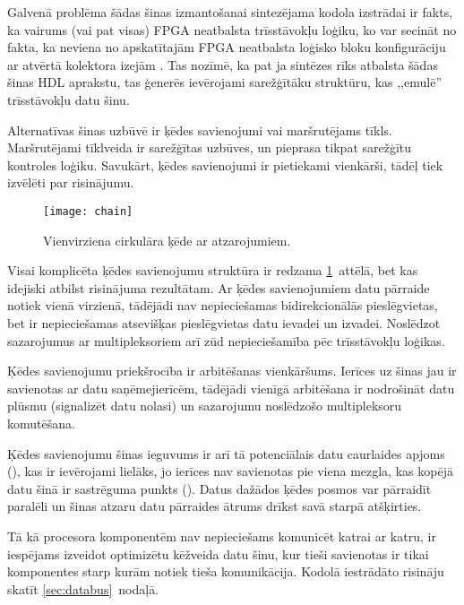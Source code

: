 	Galvenā problēma šādas šinas izmantošanai sintezējama kodola izstrādai ir
	fakts, ka vairums (vai pat visas) FPGA neatbalsta trīsstāvokļu
	loģiku, ko var secināt no fakta, ka neviena no apskatītajām FPGA neatbalsta
	loģisko bloku konfigurāciju ar atvērtā kolektora izejām
	\cite[18.~lpp.]{FusionFAQ}\cite{SmartFusionFabric}\cite{Xilinx7}.
	Tas nozīmē, ka pat ja sintēzes rīks atbalsta šādas šinas HDL aprakstu, tas
	ģenerēs ievērojami sarežģītāku struktūru, kas ,,emulē'' trīsstāvokļu datu šinu.

	Alternatīvas šinas uzbūvē ir ķēdes savienojumi vai maršrutējams tīkls.
	Maršrutējami tīklveida ir sarežģītas uzbūves, un pieprasa tikpat sarežģītu
	kontroles loģiku. Savukārt, ķēdes savienojumi ir pietiekami vienkārši,
	tādēļ tiek izvēlēti par risinājumu.

	\begin{figure}[thb]
		\centering
		\texttt{[image: chain]}
		\caption{Vienvirziena cirkulāra ķēde ar atzarojumiem.}
		\label{fig:chain}
	\end{figure}

	Visai komplicēta ķēdes savienojumu struktūra ir redzama \ref{fig:chain}~attēlā,
	bet kas idejiski atbilst risinājuma rezultātam. 
	Ar ķēdes savienojumiem datu pārraide notiek vienā virzienā,
	tādējādi nav nepieciešamas bidirekcionālās pieslēgvietas, bet ir nepieciešamas
	atsevišķas pieslēgvietas datu ievadei un izvadei. Noslēdzot sazarojumus ar
	multipleksoriem arī zūd nepieciešamība pēc trīsstāvokļu loģikas.

	Ķēdes savienojumu priekšrocība ir arbitēšanas vienkāršums. Ierīces uz šinas
	jau ir savienotas ar datu saņēmejierīcēm, tādējādi vienīgā arbitēšana ir
	nodrošināt datu plūsmu (signalizēt datu nolasi) un sazarojumu noslēdzošo
	multipleksoru komutēšana.
	
	Ķēdes savienojumu šinas ieguvums ir arī tā potenciālais datu caurlaides
	apjoms (), kas ir ievērojami lielāks, jo ierīces nav
	savienotas pie viena mezgla, kas kopējā datu šinā ir sastrēguma punkts
	(). Datus dažādos ķēdes posmos var pārraidīt
	paralēli un šinas atzaru datu pārraides ātrums drīkst savā starpā 
	atšķirties.

	Tā kā procesora komponentēm nav nepieciešams komunicēt katrai ar katru, ir
	iespējams izveidot optimizētu kēžveida datu šinu, kur tieši savienotas ir tikai
	komponentes starp kurām notiek tieša komunikācija. Kodolā iestrādāto
	risināju skatīt \ref{sec:databus}~nodaļā.

\pagebreak[3]
